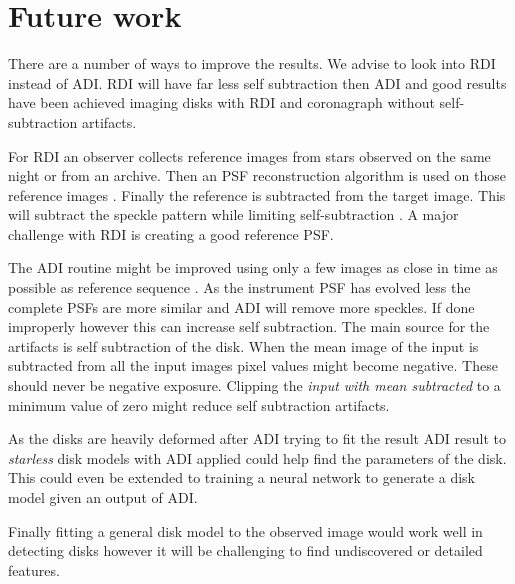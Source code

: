 \chapter{Future work}
\label{chap:future}


There are a number of ways to improve the results. We advise to look into \ac{RDI} instead of \ac{ADI}. \ac{RDI} will have far less self subtraction then \ac{ADI} and good results have been achieved imaging disks with \ac{RDI} and coronagraph \cite{rdi} without self-subtraction artifacts. 

For \ac{RDI} an observer collects reference images from stars observed on the same night or from an archive. Then an \ac{PSF} reconstruction algorithm is used on those reference images \cite{rdi}. Finally the reference is subtracted from the target image. This will subtract the speckle pattern while limiting self-subtraction \cite{rdi_2}. A major challenge with \ac{RDI} is creating a good reference \ac{PSF}.

The \ac{ADI} routine might be improved using only a few images as close in time as possible as reference sequence \cite{Marois_2006}. As the instrument \ac{PSF} has evolved less the complete \acp{PSF} are more similar and \ac{ADI} will remove more speckles. If done improperly however this can increase self subtraction. The main source for the artifacts is self subtraction of the disk. When the mean image of the input is subtracted from all the input images pixel values might become negative. These should never be negative exposure. Clipping the \textit{input with mean subtracted} to a minimum value of zero might reduce self subtraction artifacts.

As the disks are heavily deformed after \ac{ADI} trying to fit the result \ac{ADI} result to \textit{starless} disk models with \ac{ADI} applied could help find the parameters of the disk. This could even be extended to training a neural network to generate a disk model given an output of \ac{ADI}.

Finally fitting a general disk model to the observed image would work well in detecting disks however it will be challenging to find undiscovered or detailed features.
